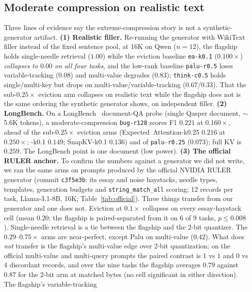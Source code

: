 \documentclass[11pt]{article}
\begin{document}
\subsection{Moderate compression on realistic text}
\label{sec:realistic}
Three lines of evidence say the extreme-compression story is not a
synthetic-generator artifact. \textbf{(1) Realistic filler.} Re-running the
generator with WikiText filler instead of the fixed sentence pool, at 16K on Qwen
($n{=}12$), the flagship holds single-needle retrieval ($1.00$) while the
eviction baseline \texttt{ea-k0.1} ($0.100\times$) \emph{collapses to $0.00$ on
all four tasks}, and the low-rank baseline \texttt{palu-r0.5} loses
variable-tracking ($0.08$) and multi-value degrades ($0.83$); \texttt{think-c0.5}
holds single/multi-key but drops on multi-value/variable-tracking ($0.67$/$0.33$).
That the sub-$0.25\times$ eviction arm collapses on realistic text while the
flagship does not is the same ordering the synthetic generator shows, on
independent filler. \textbf{(2) LongBench.} On a LongBench~\citep{bai2024longbench}
document-QA probe (single Qasper document, $\sim$5.6K tokens), a
moderate-compression \texttt{bug-r128} scores F1 $0.221$ at $0.160\times$, ahead
of the sub-$0.25\times$ eviction arms (Expected~Attention-k0.25 $0.216$ at
$0.250\times$; -k0.1 $0.149$; SnapKV-k0.1 $0.136$) and of \texttt{palu-r0.25}
($0.073$); full KV is $0.259$. The LongBench point is one document (low power).
\textbf{(3) The official RULER anchor.} To confirm the numbers against a
generator we did not write, we ran the same arms on prompts produced by the
official NVIDIA RULER generator (commit \texttt{c3f5e3b}: its essay and noise
haystacks, needle types, templates, generation budgets and
\texttt{string\_match\_all} scoring; 12 records per task, Llama-3.1-8B, 16K;
Table~\ref{tab:official}). Three things transfer from our generator and one does
not. Eviction at $0.1\times$ collapses on every essay-haystack cell (mean $0.20$;
the flagship is paired-separated from it on 6 of 9 tasks, $p\le0.008$).
Single-needle retrieval is a tie between the flagship and the 2-bit quantizer.
The $0.29$--$0.75\times$ arms are near-perfect, except Palu on multi-value ($0.42$). What
does \emph{not} transfer is the flagship's multi-value edge over 2-bit
quantization: on the official multi-value and multi-query prompts the paired
contrast is $1$ vs $1$ and $0$ vs $4$ discordant records, and over the nine tasks
the flagship averages $0.79$ against $0.87$ for the 2-bit arm at matched bytes
(no cell significant in either direction). The flagship's variable-tracking
\end{document}
